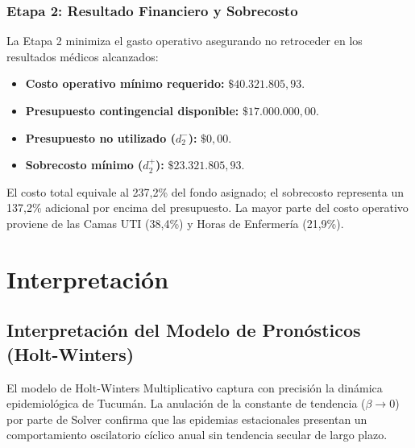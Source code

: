 \documentclass[conference]{IEEEtran}
\begin{document}
\subsubsection{Etapa 2: Resultado Financiero y Sobrecosto}
La Etapa 2 minimiza el gasto operativo asegurando no retroceder en los resultados médicos alcanzados:
\begin{itemize}
    \item \textbf{Costo operativo mínimo requerido:} $\$40.321.805,93$.
    \item \textbf{Presupuesto contingencial disponible:} $\$17.000.000,00$.
    \item \textbf{Presupuesto no utilizado ($d_2^-$):} $\$0,00$.
    \item \textbf{Sobrecosto mínimo ($d_2^+$):} $\$23.321.805,93$.
\end{itemize}

El costo total equivale al 237,2\% del fondo asignado; el sobrecosto representa un 137,2\% adicional por encima del presupuesto. La mayor parte del costo operativo proviene de las Camas UTI (38,4\%) y Horas de Enfermería (21,9\%).

\section{Interpretación}

\subsection{Interpretación del Modelo de Pronósticos (Holt-Winters)}
El modelo de Holt-Winters Multiplicativo captura con precisión la dinámica epidemiológica de Tucumán. La anulación de la constante de tendencia ($\beta \to 0$) por parte de Solver confirma que las epidemias estacionales presentan un comportamiento oscilatorio cíclico anual sin tendencia secular de largo plazo.
\end{document}

